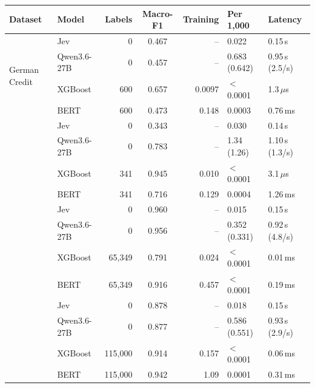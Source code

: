 \begin{tabular}{llrcrll}
\toprule
Dataset & Model & Labels & Macro-F1 & Training & Per 1,000 & Latency \\
\midrule
\multirow{4}{*}{German Credit} & Jev & 0 & 0.467 & -- & 0.022 & 0.15\,s \\
 & Qwen3.6-27B & 0 & 0.457 & -- & 0.683 (0.642) & 0.95\,s (2.5/s) \\
 & XGBoost & 600 & 0.657 & 0.0097 & $<$0.0001 & 1.3\,$\mu$s \\
 & BERT & 600 & 0.473 & 0.148 & 0.0003 & 0.76\,ms \\
\addlinespace
\multirow{4}{*}{Breast Cancer Wisconsin} & Jev & 0 & 0.343 & -- & 0.030 & 0.14\,s \\
 & Qwen3.6-27B & 0 & 0.783 & -- & 1.34 (1.26) & 1.10\,s (1.3/s) \\
 & XGBoost & 341 & 0.945 & 0.010 & $<$0.0001 & 3.1\,$\mu$s \\
 & BERT & 341 & 0.716 & 0.129 & 0.0004 & 1.26\,ms \\
\addlinespace
\multirow{4}{*}{SST-2} & Jev & 0 & 0.960 & -- & 0.015 & 0.15\,s \\
 & Qwen3.6-27B & 0 & 0.956 & -- & 0.352 (0.331) & 0.92\,s (4.8/s) \\
 & XGBoost & 65{,}349 & 0.791 & 0.024 & $<$0.0001 & 0.01\,ms \\
 & BERT & 65{,}349 & 0.916 & 0.457 & $<$0.0001 & 0.19\,ms \\
\addlinespace
\multirow{4}{*}{AG News} & Jev & 0 & 0.878 & -- & 0.018 & 0.15\,s \\
 & Qwen3.6-27B & 0 & 0.877 & -- & 0.586 (0.551) & 0.93\,s (2.9/s) \\
 & XGBoost & 115{,}000 & 0.914 & 0.157 & $<$0.0001 & 0.06\,ms \\
 & BERT & 115{,}000 & 0.942 & 1.09 & 0.0001 & 0.31\,ms \\
\bottomrule
\end{tabular}
